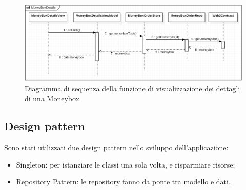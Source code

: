 \begin{figure}[H]
    \begin{center}
    \includegraphics[width=\textwidth]{immagini/moneyboxdetails.png}
    \caption{Diagramma di sequenza della funzione di visualizzazione dei dettagli di una Moneybox}
    \end{center}
\end{figure}

\clearpage

\subsection{Design pattern}

Sono stati utilizzati due design pattern nello sviluppo dell'applicazione:
\begin{itemize}
    \item Singleton: per istanziare le classi una sola volta, e risparmiare risorse;
    \item Repository Pattern: le repository fanno da ponte tra modello e dati.
\end{itemize}

